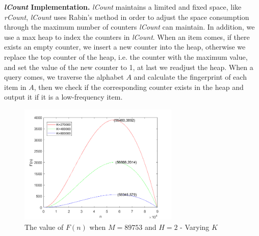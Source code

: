 \documentclass[conference]{IEEEtran}
\begin{document}
\textbf{\emph{lCount} Implementation.} \emph{lCount} maintains a limited and fixed space, like \emph{rCount}, \emph{lCount} uses Rabin's method in order to adjust the space consumption through the maximum number of counters \emph{lCount} can maintain. In addition, we use a max heap to index the counters in \emph{lCount}. When an item comes, if there exists an empty counter, we insert a new counter into the heap, otherwise we replace the top counter of the heap, i.e. the counter with the maximum value, and set the value of the new counter to 1, at last we readjust the heap. When a query comes, we traverse the alphabet $A$ and calculate the fingerprint of each item in $A$, then we check if the corresponding counter exists in the heap and output it if it is a low-frequency item.\par


\begin{figure}
	\centering
	\includegraphics[width=3in]{png/F(n)-combine.png}
	\caption{The value of $F(n)$ when $M=89753$ and $H=2$ - Varying $K$}
	\label{fig:F(n)}
\end{figure}
\end{document}
